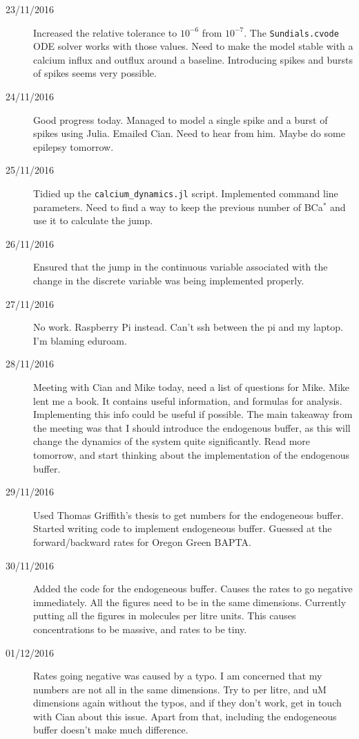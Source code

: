 \documentclass[a4paper,12pt]{article}
\theoremstyle{definition}
\begin{document}
\begin{description}
	\item[23/11/2016] Increased the relative tolerance to $10^{-6}$ from $10^{-7}$. The \texttt{Sundials.cvode} ODE solver works with those values. Need to make the model stable with a calcium influx and outflux around a baseline. Introducing spikes and bursts of spikes seems very possible.

	\item[24/11/2016] Good progress today. Managed to model a single spike and a burst of spikes using Julia. Emailed Cian. Need to hear from him. Maybe do some epilepsy tomorrow.

	\item[25/11/2016] Tidied up the \texttt{calcium\_dynamics.jl} script. Implemented command line parameters. Need to find a way to keep the previous number of BCa$^*$ and use it to calculate the jump.

	\item[26/11/2016] Ensured that the jump in the continuous variable  associated with the change in the discrete variable was being implemented properly.

	\item[27/11/2016] No work. Raspberry Pi instead. Can't ssh between the pi and my laptop. I'm blaming eduroam.

	\item[28/11/2016] Meeting with Cian and Mike today, need a list of questions for Mike. Mike lent me a book. It contains useful information, and formulas for analysis. Implementing this info could be useful if possible. The main takeaway from the meeting was that I should introduce the endogenous buffer, as this will change the dynamics of the system quite significantly. Read more tomorrow, and start thinking about the implementation of the endogenous buffer.

	\item[29/11/2016] Used Thomas Griffith's thesis to get numbers for the endogeneous buffer. Started writing code to implement endogeneous buffer. Guessed at the forward/backward rates for Oregon Green BAPTA.

	\item[30/11/2016] Added the code for the endogeneous buffer. Causes the rates to go negative immediately. All the figures need to be in the same dimensions. Currently putting all the figures in molecules per litre units. This causes concentrations to be massive, and rates to be tiny.

	\item[01/12/2016] Rates going negative was caused by a typo. I am concerned that my numbers are not all in the same dimensions. Try to per litre, and uM dimensions again without the typos, and if they don't work, get in touch with Cian about this issue. Apart from that, including the endogeneous buffer doesn't make much difference.


\end{description}
\end{document}
